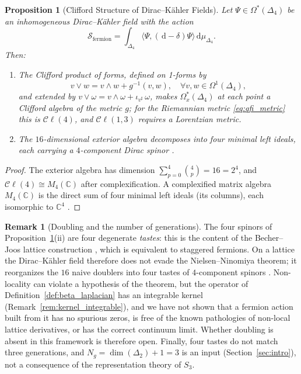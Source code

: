 \documentclass[11pt,a4paper,reqno]{amsart}
\newtheorem{proposition}[theorem]{Proposition}
\theoremstyle{definition}
\newtheorem{remark}[theorem]{Remark}
\numberwithin{equation}{section}
\newcommand{\C}{\mathbb{C}}
\newcommand{\dif}{\,\mathrm{d}}
\begin{document}
\begin{proposition}[Clifford Structure of Dirac--K\"ahler Fields]
\label{thm:nielsen_ninomiya_evasion}
Let $\Psi \in \Omega^*(\Delta_4)$ be an inhomogeneous Dirac--K\"ahler field with the action
\begin{equation}
    \mathcal{S}_{\mathrm{fermion}} = \int_{\Delta_4} \langle \Psi, (\dif - \delta) \Psi \rangle \dif \mu_{\Delta_4}.
\end{equation}
Then:
\begin{enumerate}[label=(\roman*)]
    \item The Clifford product of forms, defined on 1-forms by
    \begin{equation}
        v \vee w = v \wedge w + g^{-1}(v, w), \quad \forall v, w \in \Omega^1(\Delta_4),
    \end{equation}
    and extended by $v \vee \omega = v \wedge \omega + \iota_{v^\sharp}\, \omega$, makes $\Omega^*_x(\Delta_4)$ at each point a Clifford algebra of the metric $g$; for the Riemannian metric \eqref{eq:qfi_metric} this is $\mathcal{C}\ell(4)$, and $\mathcal{C}\ell(1,3)$ requires a Lorentzian metric.
    \item The $16$-dimensional exterior algebra decomposes into four minimal left ideals, each carrying a $4$-component Dirac spinor \cite{kahler1962innere, becher1982dirac}.
\end{enumerate}
\end{proposition}
\begin{proof}
The exterior algebra has dimension $\sum_{p=0}^4 \binom{4}{p} = 16 = 2^4$, and $\mathcal{C}\ell(4) \cong M_4(\C)$ after complexification. A complexified matrix algebra $M_4(\C)$ is the direct sum of four minimal left ideals (its columns), each isomorphic to $\C^4$ \cite{kahler1962innere, becher1982dirac, rabin1982homology}.
\end{proof}

\begin{remark}[Doubling and the number of generations]
\label{rem:nn_caveats}
The four spinors of Proposition~\ref{thm:nielsen_ninomiya_evasion}(ii) are four degenerate \emph{tastes}: this is the content of the Becher--Joos lattice construction \cite{becher1982dirac}, which is equivalent to staggered fermions. On a lattice the Dirac--K\"ahler field therefore does not evade the Nielsen--Ninomiya theorem; it reorganizes the $16$ naive doublers into four tastes of $4$-component spinors \cite{becher1982dirac, rabin1982homology}. Non-locality can violate a hypothesis of the theorem, but the operator of Definition~\ref{def:beta_laplacian} has an integrable kernel (Remark~\ref{rem:kernel_integrable}), and we have not shown that a fermion action built from it has no spurious zeros, is free of the known pathologies of non-local lattice derivatives, or has the correct continuum limit. Whether doubling is absent in this framework is therefore open. Finally, four tastes do not match three generations, and $N_g = \dim(\Delta_2) + 1 = 3$ is an input (Section~\ref{sec:intro}), not a consequence of the representation theory of $S_3$.
\end{remark}
\end{document}
